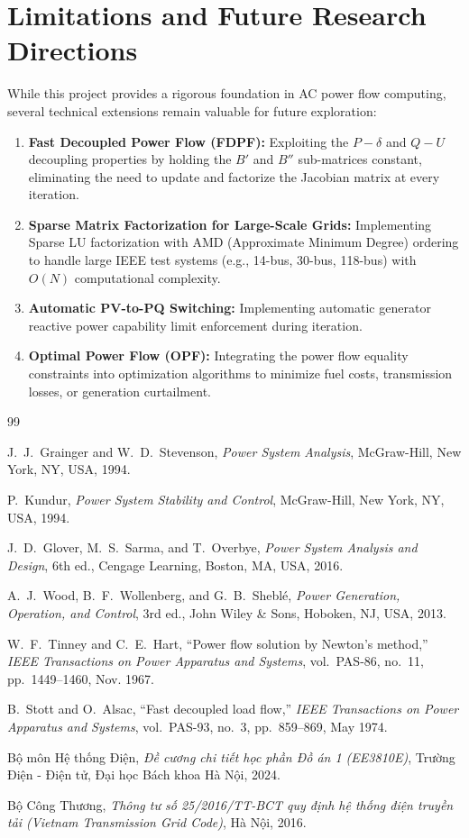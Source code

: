 \documentclass[12pt,a4paper,oneside]{report}
\begin{document}
\section{Limitations and Future Research Directions}
While this project provides a rigorous foundation in AC power flow computing, several technical extensions remain valuable for future exploration:
\begin{enumerate}
    \item \textbf{Fast Decoupled Power Flow (FDPF):} Exploiting the $P-\delta$ and $Q-U$ decoupling properties by holding the $B'$ and $B''$ sub-matrices constant, eliminating the need to update and factorize the Jacobian matrix at every iteration.
    \item \textbf{Sparse Matrix Factorization for Large-Scale Grids:} Implementing Sparse LU factorization with AMD (Approximate Minimum Degree) ordering to handle large IEEE test systems (e.g., 14-bus, 30-bus, 118-bus) with $O(N)$ computational complexity.
    \item \textbf{Automatic PV-to-PQ Switching:} Implementing automatic generator reactive power capability limit enforcement during iteration.
    \item \textbf{Optimal Power Flow (OPF):} Integrating the power flow equality constraints into optimization algorithms to minimize fuel costs, transmission losses, or generation curtailment.
\end{enumerate}

\begin{thebibliography}{99}

J.~J.~Grainger and W.~D.~Stevenson, \textit{Power System Analysis}, McGraw-Hill, New York, NY, USA, 1994.

P.~Kundur, \textit{Power System Stability and Control}, McGraw-Hill, New York, NY, USA, 1994.

J.~D.~Glover, M.~S.~Sarma, and T.~Overbye, \textit{Power System Analysis and Design}, 6th ed., Cengage Learning, Boston, MA, USA, 2016.

A.~J.~Wood, B.~F.~Wollenberg, and G.~B.~Sheblé, \textit{Power Generation, Operation, and Control}, 3rd ed., John Wiley \& Sons, Hoboken, NJ, USA, 2013.

W.~F.~Tinney and C.~E.~Hart, ``Power flow solution by Newton's method,'' \textit{IEEE Transactions on Power Apparatus and Systems}, vol.~PAS-86, no.~11, pp.~1449--1460, Nov. 1967.

B.~Stott and O.~Alsac, ``Fast decoupled load flow,'' \textit{IEEE Transactions on Power Apparatus and Systems}, vol.~PAS-93, no.~3, pp.~859--869, May 1974.

Bộ môn Hệ thống Điện, \textit{Đề cương chi tiết học phần Đồ án 1 (EE3810E)}, Trường Điện - Điện tử, Đại học Bách khoa Hà Nội, 2024.

Bộ Công Thương, \textit{Thông tư số 25/2016/TT-BCT quy định hệ thống điện truyền tải (Vietnam Transmission Grid Code)}, Hà Nội, 2016.

\end{thebibliography}
\end{document}

